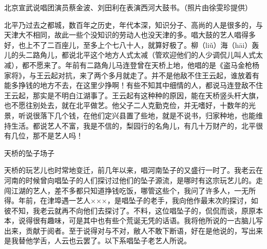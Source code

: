 \documentclass[12pt,UTF8]{ctexbook}
\begin{document}
北京宣武说唱团演员蔡金波、刘田利在表演西河大鼓书。（照片由徐雯珍提供）



北平乃过去之都城，数百年之历史，年代本深，知识分子、高尚的人是很多的，与天津大不相同，故此一些个没知识的劳动人也没天津的多。唱大鼓的艺人唱得多好，也上不了二百座儿，至多上个七八十人，就算好极了。柳（liǔ）海（hāi）轰儿的头二路角儿，都说北平这个地方人式太减（管欢迎他们的人少调侃儿叫人式太减），都不愿来了。年前有二路角儿马连登曾在天桥上地，他唱的是《盗马金枪杨家将》，与王云起对抗，来了两个多月就走了。并不是他敌不住王云起，谁放着有能多挣钱的地方不去，在这里少挣啊！有些不知其中细情的人，都说马连登敌不住王云起，那实是不明白江湖事了。王云起有这种种的原因，能在天桥竖头杆大旗，也不愿往别处去，就在北平做艺。他父子二人克勤克俭，并无嗜好，十数年的光景，听说很落下几个钱，在他们定兴县置了些地，就是不说书，归家种地，也能维持生活。都说艺人不富，我是不信的，梨园行的名角儿，有几十万财产的，北平很有几位，那不是艺人吗！





天桥的坠子场子


天桥的玩艺儿也时常地变迁，前几年以来，唱河南坠子的又盛行一时了。我老云在河南的时候曾向唱坠子的人们探讨过他们的坠子源流，是哪时有这宗玩艺儿的。走闯江湖的艺人，差不多都只知道挣钱吃饭，哪管这些个，我问了许多人，一无所得。年前，在津埠遇一艺人×××，是唱坠子的老手，我向他作最末次的探讨，如彼不知，我老云就再不向他们去探讨了。不料，这位唱坠子的，侃侃而谈，原原本本，说得很有趣味，可是其中也有些个荒诞无凭的话语。我将他所说的一古脑儿写出来，贡献于阅者。至于说得对与不对，敝人不敢下断语，好在是他说的，写出来是我替他学舌，人云也云罢了。以下系唱坠子老艺人所说。
\end{document}

